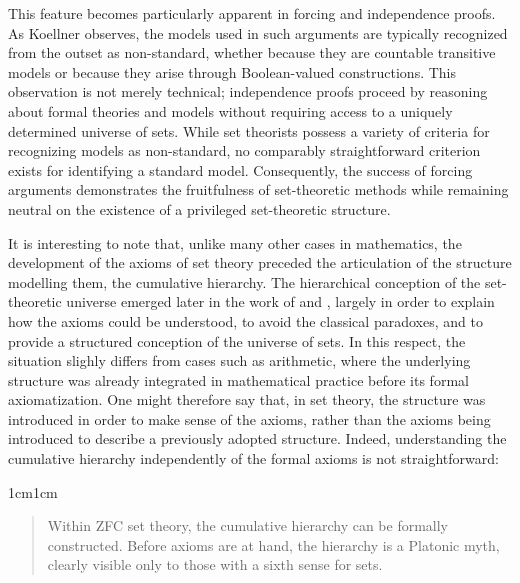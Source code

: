 \documentclass[11pt,a4paper]{book}
\theoremstyle{plain}
\begin{document}
This feature becomes particularly apparent in forcing and independence proofs. As Koellner observes, the models used in such arguments are typically recognized from the outset as non-standard, whether because they are countable transitive models or because they arise through Boolean-valued constructions. This observation is not merely technical; independence proofs proceed by reasoning about formal theories and models without requiring access to a uniquely determined universe of sets. While set theorists possess a variety of criteria for recognizing models as non-standard, no comparably straightforward criterion exists for identifying a standard model. Consequently, the success of forcing arguments demonstrates the fruitfulness of set-theoretic methods while remaining neutral on the existence of a privileged set-theoretic structure.

It is interesting to note that, unlike many other cases in mathematics, the development of the axioms of set theory preceded the articulation of the structure modelling them, the cumulative hierarchy. The hierarchical conception of the set-theoretic universe emerged later in the work of \textcite{vonNeumann1925} and \textcite{Zermelo1930}, largely in order to explain how the axioms could be understood, to avoid the classical paradoxes, and to provide a structured conception of the universe of sets. In this respect, the situation slighly differs from cases such as arithmetic, where the underlying structure was already integrated in mathematical practice before its formal axiomatization. One might therefore say that, in set theory, the structure was introduced in order to make sense of the axioms, rather than the axioms being introduced to describe a previously adopted structure. Indeed, understanding the cumulative hierarchy independently of the formal axioms is not straightforward:

\begin{adjustwidth}{1cm}{1cm}
\small
\begin{quote}
Within ZFC set theory, the cumulative hierarchy can be formally constructed. Before axioms are at hand, the hierarchy is a Platonic myth, clearly visible only to those with a sixth sense for sets. \textcite[373]{maclane1986mathematics}
\end{quote}
\end{adjustwidth}
\end{document}
